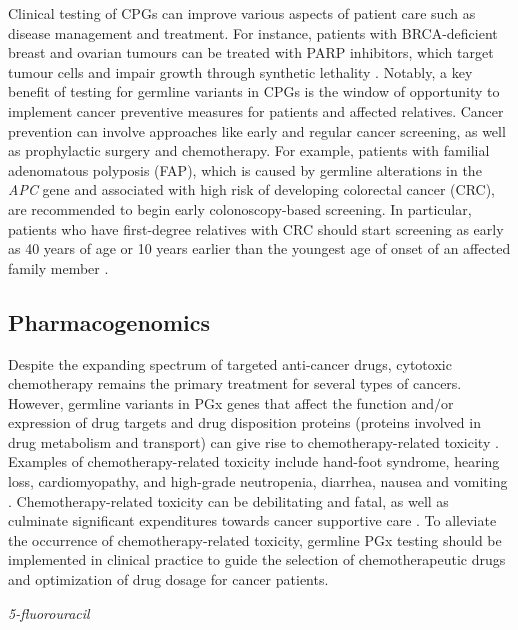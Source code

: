Clinical testing of CPGs can improve various aspects of patient care such as disease management and treatment. For instance, patients with BRCA-deficient breast and ovarian tumours can be treated with PARP inhibitors, which target tumour cells and impair growth through synthetic lethality \cite{Dedes2011, Helleday2011}. Notably, a key benefit of testing for germline variants in CPGs is the window of opportunity to implement cancer preventive measures for patients and affected relatives. Cancer prevention can involve approaches like early and regular cancer screening, as well as prophylactic surgery and chemotherapy. For example, patients with familial adenomatous polyposis (\acs{FAP}), which is caused by germline alterations in the \textit{APC} gene and associated with high risk of developing colorectal cancer (CRC), are recommended to begin early colonoscopy-based screening. In particular, patients who have first-degree relatives with CRC should start screening as early as 40 years of age or 10 years earlier than the youngest age of onset of an affected family member \cite{Blanco2015}.

\subsection{Pharmacogenomics}

Despite the expanding spectrum of targeted anti-cancer drugs, cytotoxic chemotherapy remains the primary treatment for several types of cancers. However, germline variants in PGx genes that affect the function and$/$or expression of drug targets and drug disposition proteins (proteins involved in drug metabolism and transport) can give rise to chemotherapy-related toxicity \cite{Panczyk2014, Mohelnikova-Duchonova2014}. Examples of chemotherapy-related toxicity include hand-foot syndrome, hearing loss, cardiomyopathy, and high-grade neutropenia, diarrhea, nausea and vomiting \cite{Deenen2011, Hong2011, Lee2014, Kumar2012, Rybak2009}. Chemotherapy-related toxicity can be debilitating and fatal, as well as culminate significant expenditures towards cancer supportive care \cite{Paessens2011, Bennett2007, Rashid2016}. To alleviate the occurrence of chemotherapy-related toxicity, germline PGx testing should be implemented in clinical practice to guide the selection of chemotherapeutic drugs and optimization of drug dosage for cancer patients.

\vspace{5mm}
\noindent\textit{5-fluorouracil}


